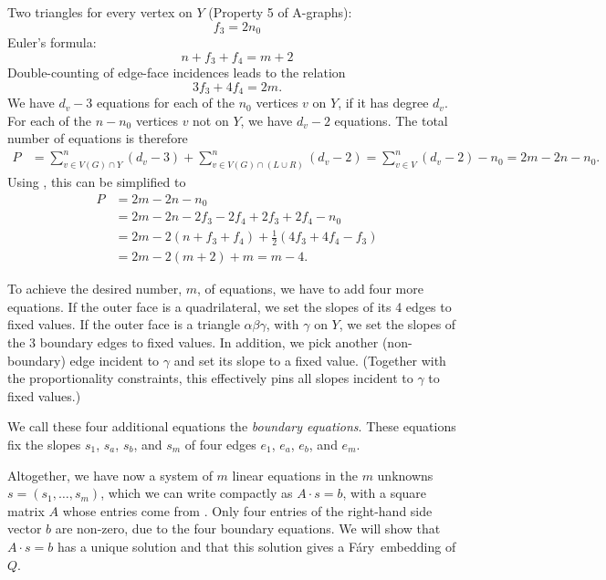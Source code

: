 \documentclass{patmorin}
\newcommand{\Fary}{Fáry}
\begin{document}
Two triangles for every vertex on $Y$ (Property 5 of A-graphs):
\begin{equation}
  \label{eq:f3}
  f_3 = 2n_0
\end{equation}
Euler's formula:
\begin{equation}
  \label{eq:Euler}
  n + f_3+f_4 = m+2
\end{equation}
Double-counting of edge-face incidences leads to the relation
\begin{equation}
  \label{eq:edge-face}
  3f_3+4f_4=2m.
\end{equation}
We have $d_v-3$ equations for each of the $n_0$ vertices $v$ on $Y$, if it has
degree $d_v$. For each of the 
 $n-n_0$ vertices $v$ not on $Y$, 
we have $d_v-2$ equations.
  The total number of equations is therefore
  \begin{align*}
P &= 
\sum_{v\in V(G)\cap Y}^n(d_v-3)+
\sum_{v\in V(G)\cap(L\cup R)}^n(d_v-2)
=
\sum_{v\in V}^n(d_v-2)-n_0
=
2m-2n-n_0.
  \end{align*}
Using \thetag{\ref{eq:f3}--\ref{eq:edge-face}}, this can be
simplified to
\begin{align*}
P&=
2m-2n-n_0\\
&= 2m -2n -2f_3-2f_4 +2f_3+2f_4-n_0\\
&= 2m -2(n +f_3+f_4) +\tfrac12(4f_3+4f_4-f_3)\\
&= 2m -2(m+2) +m = m-4.
\end{align*}

To achieve the desired number, $m$, of equations, we have to add
four more equations.  If the outer face is a quadrilateral, we set
the slopes of its 4 edges to fixed values.  If the outer face is a
triangle $\alpha\beta\gamma$, with $\gamma$ on $Y$, we set the slopes
of the 3 boundary edges to fixed values. In addition, we pick another
(non-boundary) edge incident to $\gamma$ and set its slope to a fixed
value.  (Together with the proportionality constraints, this effectively
pins all slopes incident to $\gamma$ to fixed values.)

We call these four additional equations the \emph{boundary equations}.
These equations fix the slopes $s_1$, $s_a$, $s_b$, and $s_m$ of four
edges $e_1$, $e_a$, $e_b$, and $e_m$.

Altogether, we have now a system of $m$ linear equations
in the $m$ unknowns $s=(s_1,\ldots,s_m)$, which we can write
compactly as
 $A\cdot s = b$, with a square matrix $A$ whose entries come from
 \thetag{\ref{eq:slope0}--\ref{eq:proportion2}}.
Only four entries of
the right-hand side vector
 $b$
are non-zero, due to the four boundary equations.
We will show that $A\cdot s=b$ has a unique
solution and that this solution gives a \Fary\ embedding of $Q$.
\end{document}
